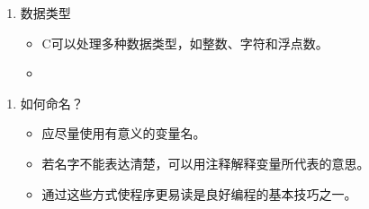 \begin{frame}[fragile]
  \begin{enumerate}[1]
  \item 数据类型\\[0.1in]
    \begin{itemize}
    \item C可以处理多种数据类型，如整数、字符和浮点数。\\[0.1in]
    \item {}
    \end{itemize}
  \end{enumerate}

  \begin{enumerate}[2]
  \item 如何命名？\\[0.1in]
    \begin{itemize}
    \item 应尽量使用有意义的变量名。\\[0.1in]
    \item 若名字不能表达清楚，可以用注释解释变量所代表的意思。\\[0.1in]
    \item 通过这些方式使程序更易读是良好编程的基本技巧之一。 
    \end{itemize}
  \end{enumerate}
\end{frame}


